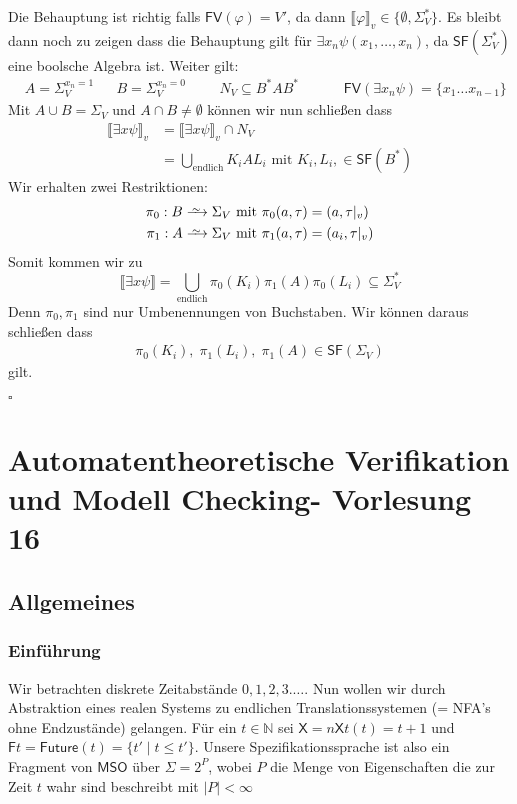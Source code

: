 \documentclass[12pt, german]{article}
\newcommand\iso{\xrightarrow{
		\,\smash{\raisebox{-0.65ex}{\ensuremath{\scriptstyle\sim}}}\,}}
\newcommand{\N}{\mathbb{N}}
\newcommand{\sigstern}{\Sigma^\ast}
\newcommand{\starfree}{\mathsf{SF}}
\newcommand{\bast}{B^{\ast}}
\newcommand{\fv}{\mathsf{FV}}
\newcommand{\mso}{\mathsf{MSO}}
\newcommand{\sX}{\mathsf{X}}
\newcommand{\sF}{\mathsf{F}}
\newcommand{\bewiesen}{
	
	\begin{flushright}
		$\square$  \\
\end{flushright}}
\begin{document}
	Die Behauptung ist richtig falls $\fv(\varphi) = V'$, da dann $\llbracket \varphi \rrbracket_v \in \{\emptyset, \sigstern_V\}$. Es bleibt dann noch zu zeigen dass die Behauptung gilt für 
	$\exists x_n\psi(x_1, \ldots, x_n)$, da $\starfree(\sigstern_V)$ eine boolsche Algebra ist. Weiter gilt:
	\begin{align*}
		&A = \Sigma_V^{x_n = 1} &&B= \Sigma_V^{x_n = 0} &&&N_V \subseteq \bast A \bast &&&&\fv(\exists x_n \psi) = \{x_1\ldots x_{n-1}\}
	\end{align*}
	Mit $A \cup B = \Sigma_V$ und $A \cap B \not = \emptyset$ können wir nun schließen dass 
	\begin{align*}
		\llbracket \exists x \psi \rrbracket_v &= \llbracket \exists x \psi \rrbracket_v \cap N_V \\ 
		&= \bigcup_{\text{endlich}} K_iAL_i \text{ mit } K_i, L_i, \in \starfree(\bast)
	\end{align*}
	Wir erhalten zwei Restriktionen: 
		\begin{align*}
			\pi_0 : B &\iso \Sigma_V \text{ mit } \pi_0(a, \tau) = (a, \tau|_v) \\
			\pi_1 : A &\iso \Sigma_V \text{ mit } \pi_1(a, \tau) = (a_i, \tau|_v) 
		\end{align*}
	Somit kommen wir zu $$\llbracket \exists x \psi \rrbracket = \bigcup_{\text{endlich}} \pi_0(K_i) \pi_1(A)\pi_0(L_i) \subseteq \sigstern_V$$ Denn $\pi_0, \pi_1$ sind nur Umbenennungen von Buchstaben. Wir können daraus schließen dass 
		\begin{align*}
			\pi_0(K_i), \; \pi_1(L_i), \; \pi_1(A) \in \starfree(\Sigma_V)
		\end{align*} gilt. 
		\bewiesen
	
\section{Automatentheoretische Verifikation und Modell Checking- Vorlesung 16}
\subsection{Allgemeines}
\subsubsection{Einführung}
	Wir betrachten diskrete Zeitabstände $0,1,2,3. \ldots$. Nun wollen wir durch Abstraktion eines realen Systems zu endlichen Translationssystemen (= NFA's ohne Endzustände) gelangen. 
	Für ein $t \in \N$ sei $\sX = n\sX t(t) = t+1$ und $\sF t = \mathsf{Future}(t) = \{t' \mid t \leq t'\}$. Unsere Spezifikationssprache ist also ein Fragment von $\mso$ über $\Sigma = 2^P$, wobei $P$ die Menge von Eigenschaften die zur Zeit $t$ wahr sind beschreibt mit $|P| < \infty$
\end{document}
